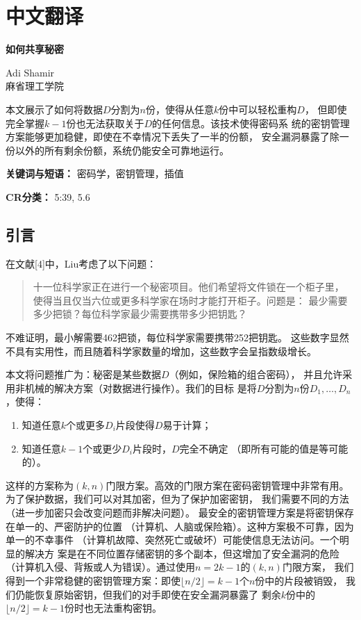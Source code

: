 \section{中文翻译}

\begin{center}
	\Large\textbf{如何共享秘密}

	\vspace{0.5cm}
	\large Adi Shamir\\
	麻省理工学院
\end{center}

\vspace{0.5cm}

本文展示了如何将数据$D$分割为$n$份，使得从任意$k$份中可以轻松重构$D$，
但即使完全掌握$k-1$份也无法获取关于$D$的任何信息。该技术使得密码系
统的密钥管理方案能够更加稳健，即使在不幸情况下丢失了一半的份额，
安全漏洞暴露了除一份以外的所有剩余份额，系统仍能安全可靠地运行。

\vspace{0.3cm}
\noindent\textbf{关键词与短语：} 密码学，密钥管理，插值

\noindent\textbf{CR分类：} 5:39, 5.6

\subsection{引言}
在文献[4]中，Liu考虑了以下问题：
\begin{quote}
	十一位科学家正在进行一个秘密项目。他们希望将文件锁在一个柜子里，
	使得当且仅当六位或更多科学家在场时才能打开柜子。问题是：
	最少需要多少把锁？每位科学家最少需要携带多少把钥匙？
\end{quote}

不难证明，最小解需要462把锁，每位科学家需要携带252把钥匙。
这些数字显然不具有实用性，而且随着科学家数量的增加，这些数字会呈指数级增长。

本文将问题推广为：秘密是某些数据$D$（例如，保险箱的组合密码），
并且允许采用非机械的解决方案（对数据进行操作）。我们的目标
是将$D$分割为$n$份$D_1, \ldots, D_n$，使得：

\begin{enumerate}
	\item 知道任意$k$个或更多$D_i$片段使得$D$易于计算；
	\item 知道任意$k-1$个或更少$D_i$片段时，$D$完全不确定
	      （即所有可能的值是等可能的）。
\end{enumerate}

这样的方案称为$(k, n)$门限方案。高效的门限方案在密码密钥管理中非常有用。
为了保护数据，我们可以对其加密，但为了保护加密密钥，
我们需要不同的方法（进一步加密只会改变问题而非解决问题）。
最安全的密钥管理方案是将密钥保存在单一的、严密防护的位置
（计算机、人脑或保险箱）。这种方案极不可靠，因为单一的不幸事件
（计算机故障、突然死亡或破坏）可能使信息无法访问。一个明显的解决方
案是在不同位置存储密钥的多个副本，但这增加了安全漏洞的危险
（计算机入侵、背叛或人为错误）。通过使用$n = 2k - 1$的$(k, n)$门限方案，
我们得到一个非常稳健的密钥管理方案：即使$\lfloor n/2 \rfloor = k - 1$个$n$份中的片段被销毁，
我们仍能恢复原始密钥，但我们的对手即使在安全漏洞暴露了
剩余$k$份中的$\lfloor n/2 \rfloor = k - 1$份时也无法重构密钥。

